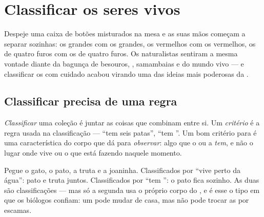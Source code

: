 \chapter{Classificar os seres vivos}\label{ch:g3:sorting-living-things}

Despeje uma caixa de botões misturados na mesa e as suas mãos
começam a separar sozinhas: os grandes com os grandes, os vermelhos
com os vermelhos, os de quatro furos com os de quatro furos. Os
naturalistas sentiram a mesma vontade diante da bagunça de besouros,
, samambaias e  do mundo vivo --- e classificar os  com cuidado acabou virando uma das ideias mais poderosas da
.

\section{Classificar precisa de uma regra}

\begin{definition}\label{def:g3:sorting-living-things:criterion}
\emph{Classificar} uma coleção é juntar as
coisas que combinam entre si. Um \emph{critério} é a
regra usada na classificação --- ``tem seis patas'', ``tem ''.
Um bom critério para  é uma característica do corpo que
dá para \emph{observar}: algo que o  ou a  \emph{tem}, e
não o lugar onde vive ou o que está fazendo naquele momento.
\end{definition}

\begin{example}\label{ex:g3:sorting-living-things:two}
Pegue o gato, o pato, a truta e a joaninha. Classificados por ``vive
perto da água'': pato e truta juntos. Classificados por ``tem
'': o pato fica sozinho. As duas são classificações --- mas só
a segunda usa o próprio corpo do , e é esse o tipo em que os
biólogos confiam: um  pode mudar de casa, mas não pode trocar
as  por escamas.
\end{example}

